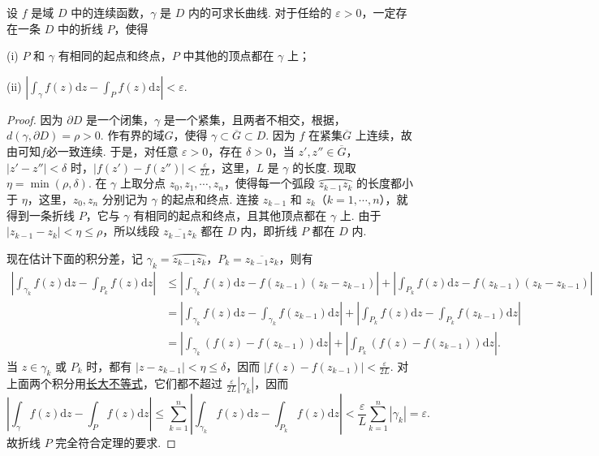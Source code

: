 \documentclass[../../main.tex]{subfiles}
\begin{document}
\begin{lemma}\label{lemma:引理:3.2.2}
设 \( f \) 是域 \( D \) 中的连续函数，\( \gamma \) 是 \( D \) 内的可求长曲线. 对于任给的 \( \varepsilon > 0 \)，一定存在一条 \( D \) 中的折线 \( P \)，使得

(i) \( P \) 和 \( \gamma \) 有相同的起点和终点，\( P \) 中其他的顶点都在 \( \gamma \) 上；

(ii) \( \left| \int_\gamma f(z)\mathrm{d}z - \int_P f(z)\mathrm{d}z \right| < \varepsilon \).
\end{lemma}
\begin{proof}
因为 \( \partial D \) 是一个闭集，\( \gamma \) 是一个紧集，且两者不相交，根据，\( d(\gamma, \partial D) = \rho > 0 \). 作有界的域\( G \)，使得 \( \gamma \subset \overline{G} \subset D \). 因为 \( f \) 在紧集\( \overline{G} \) 上连续，故由可知$f$必一致连续. 于是，对任意 \( \varepsilon > 0 \)，存在 \( \delta > 0 \)，当 \( z', z'' \in \overline{G} \)，\( |z' - z''| < \delta \) 时，\( |f(z') - f(z'')| < \frac{\varepsilon}{2L} \)，这里，\( L \) 是 \( \gamma \) 的长度. 现取 \( \eta = \min(\rho, \delta) \). 在 \( \gamma \) 上取分点 \( z_0, z_1, \cdots, z_n \)，使得每一个弧段 \( \wideparen{z_{k - 1}z_k} \) 的长度都小于 \( \eta \)，这里，\( z_0, z_n \) 分别记为 \( \gamma \) 的起点和终点. 连接 \( z_{k - 1} \) 和 \( z_k \)（\( k = 1, \cdots, n \)），就得到一条折线 \( P \)，它与 \( \gamma \) 有相同的起点和终点，且其他顶点都在 \( \gamma \) 上. 由于 \( |z_{k - 1} - z_k| < \eta \leqslant \rho \)，所以线段 \( \overline{z_{k - 1}z_k} \) 都在 \( D \) 内，即折线 \( P \) 都在 \( D \) 内.

现在估计下面的积分差，记 \( \gamma_k = \wideparen{z_{k - 1}z_k} \)，\( P_k = \overline{z_{k - 1}z_k} \)，则有
\begin{align*}
\left| \int_{\gamma_k} f(z)\mathrm{d}z - \int_{P_k} f(z)\mathrm{d}z \right|
&\leqslant \left| \int_{\gamma_k} f(z)\mathrm{d}z - f(z_{k - 1})(z_k - z_{k - 1}) \right|
+ \left| \int_{P_k} f(z)\mathrm{d}z - f(z_{k - 1})(z_k - z_{k - 1}) \right|
\\
&= \left| \int_{\gamma_k} f(z)\mathrm{d}z - \int_{\gamma_k} f(z_{k - 1})\mathrm{d}z \right| + \left| \int_{P_k} f(z)\mathrm{d}z - \int_{P_k} f(z_{k - 1})\mathrm{d}z \right|
\\
&= \left| \int_{\gamma_k} (f(z) - f(z_{k - 1}))\mathrm{d}z \right| + \left| \int_{P_k} (f(z) - f(z_{k - 1}))\mathrm{d}z \right|.
\end{align*}
当 \( z \in \gamma_k \) 或 \( P_k \) 时，都有 \( |z - z_{k - 1}| < \eta \leqslant \delta \)，因而 \( |f(z) - f(z_{k - 1})| < \frac{\varepsilon}{2L} \). 对上面两个积分用\hyperref[proposition:长大不等式]{长大不等式}，它们都不超过 \( \frac{\varepsilon}{2L}|\gamma_k| \)，因而
\[
\left| \int_\gamma f(z)\mathrm{d}z - \int_P f(z)\mathrm{d}z \right| \leqslant \sum_{k = 1}^n \left| \int_{\gamma_k} f(z)\mathrm{d}z - \int_{P_k} f(z)\mathrm{d}z \right|
< \frac{\varepsilon}{L} \sum_{k = 1}^n |\gamma_k|
= \varepsilon.
\]
故折线 \( P \) 完全符合定理的要求.

\end{proof}
\end{document}

